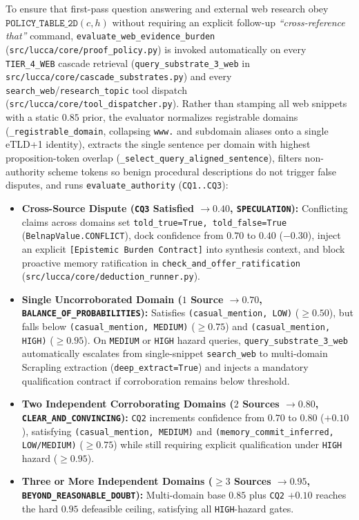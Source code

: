 \documentclass[11pt,a4paper]{article}
\begin{document}
To ensure that first-pass question answering and external web research obey $\texttt{POLICY\_TABLE\_2D}(c, h)$ without requiring an explicit follow-up \emph{``cross-reference that''} command, \texttt{evaluate\_web\_evidence\_burden} (\texttt{src/lucca/core/proof\_policy.py}) is invoked automatically on every \texttt{TIER\_4\_WEB} cascade retrieval (\texttt{query\_substrate\_3\_web} in \texttt{src/lucca/core/cascade\_substrates.py}) and every \texttt{search\_web}/\texttt{research\_topic} tool dispatch (\texttt{src/lucca/core/tool\_dispatcher.py}). Rather than stamping all web snippets with a static $0.85$ prior, the evaluator normalizes registrable domains (\texttt{\_registrable\_domain}, collapsing \texttt{www.} and subdomain aliases onto a single eTLD+1 identity), extracts the single sentence per domain with highest proposition-token overlap (\texttt{\_select\_query\_aligned\_sentence}), filters non-authority scheme tokens so benign procedural descriptions do not trigger false disputes, and runs \texttt{evaluate\_authority} (\texttt{CQ1..CQ3}):
\begin{itemize}
    \item \textbf{Cross-Source Dispute (\texttt{CQ3} Satisfied $\rightarrow 0.40$, \texttt{SPECULATION}):} Conflicting claims across domains set \texttt{told\_true=True, told\_false=True} (\texttt{BelnapValue.CONFLICT}), dock confidence from $0.70$ to $0.40$ ($-0.30$), inject an explicit \texttt{[Epistemic Burden Contract]} into synthesis context, and block proactive memory ratification in \texttt{check\_and\_offer\_ratification} (\texttt{src/lucca/core/deduction\_runner.py}).
    \item \textbf{Single Uncorroborated Domain ($1$ Source $\rightarrow 0.70$, \texttt{BALANCE\_OF\_PROBABILITIES}):} Satisfies \texttt{(casual\_mention, LOW)} ($\ge 0.50$), but falls below \texttt{(casual\_mention, MEDIUM)} ($\ge 0.75$) and \texttt{(casual\_mention, HIGH)} ($\ge 0.95$). On \texttt{MEDIUM} or \texttt{HIGH} hazard queries, \texttt{query\_substrate\_3\_web} automatically escalates from single-snippet \texttt{search\_web} to multi-domain Scrapling extraction (\texttt{deep\_extract=True}) and injects a mandatory qualification contract if corroboration remains below threshold.
    \item \textbf{Two Independent Corroborating Domains ($2$ Sources $\rightarrow 0.80$, \texttt{CLEAR\_AND\_CONVINCING}):} \texttt{CQ2} increments confidence from $0.70$ to $0.80$ ($+0.10$), satisfying \texttt{(casual\_mention, MEDIUM)} and \texttt{(memory\_commit\_inferred, LOW/MEDIUM)} ($\ge 0.75$) while still requiring explicit qualification under \texttt{HIGH} hazard ($\ge 0.95$).
    \item \textbf{Three or More Independent Domains ($\ge 3$ Sources $\rightarrow 0.95$, \texttt{BEYOND\_REASONABLE\_DOUBT}):} Multi-domain base $0.85$ plus \texttt{CQ2} $+0.10$ reaches the hard $0.95$ defeasible ceiling, satisfying all \texttt{HIGH}-hazard gates.
\end{itemize}
\end{document}
